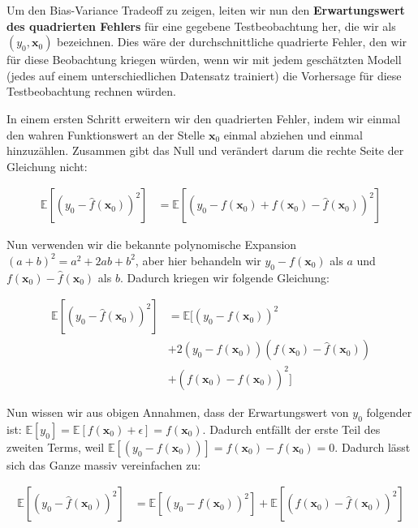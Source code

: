 \documentclass[
]{book}
\begin{document}
Um den Bias-Variance Tradeoff zu zeigen, leiten wir nun den \textbf{Erwartungswert des quadrierten Fehlers} für eine gegebene Testbeobachtung her, die wir als \((y_0,\mathbf{x}_0)\) bezeichnen. Dies wäre der durchschnittliche quadrierte Fehler, den wir für diese Beobachtung kriegen würden, wenn wir mit jedem geschätzten Modell (jedes auf einem unterschiedlichen Datensatz trainiert) die Vorhersage für diese Testbeobachtung rechnen würden.

In einem ersten Schritt erweitern wir den quadrierten Fehler, indem wir einmal den wahren Funktionswert an der Stelle \(\mathbf{x}_0\) einmal abziehen und einmal hinzuzählen. Zusammen gibt das Null und verändert darum die rechte Seite der Gleichung nicht:

\begin{align}
\mathbb{E}\left[\left(y_0 - \hat{f}(\mathbf{x}_0)\right)^2\right] &= \mathbb{E}\left[\left(y_0 - f(\mathbf{x}_0) + f(\mathbf{x}_0) - \hat{f}(\mathbf{x}_0)\right)^2\right]
\end{align}

Nun verwenden wir die bekannte polynomische Expansion \((a+b)^2=a^2+2ab+b^2\), aber hier behandeln wir \(y_0 - f(\mathbf{x}_0)\) als \(a\) und \(f(\mathbf{x}_0) - \hat{f}(\mathbf{x}_0)\) als \(b\). Dadurch kriegen wir folgende Gleichung:

\begin{align}
\mathbb{E}\left[\left(y_0 - \hat{f}(\mathbf{x}_0)\right)^2\right] &= \mathbb{E}\biggl[\left(y_0 - f(\mathbf{x}_0)\right)^2 \\
&+ 2\left(y_0 - f(\mathbf{x}_0)\right)(f(\mathbf{x}_0) - \hat{f}(\mathbf{x}_0)) \\
&+ (f(\mathbf{x}_0) - \hat{f}(\mathbf{x}_0))^2\biggr]
\end{align}

Nun wissen wir aus obigen Annahmen, dass der Erwartungswert von \(y_0\) folgender ist: \(\mathbb{E}[y_0]=\mathbb{E}[f(\mathbf{x}_0) + \epsilon]=f(\mathbf{x}_0)\). Dadurch entfällt der erste Teil des zweiten Terms, weil \(\mathbb{E}[\left(y_0 - f(\mathbf{x}_0)\right)]=f(\mathbf{x}_0) - f(\mathbf{x}_0)=0\). Dadurch lässt sich das Ganze massiv vereinfachen zu:

\begin{align}
\mathbb{E}\left[\left(y_0 - \hat{f}(\mathbf{x}_0)\right)^2\right] &= \mathbb{E}\left[\left(y_0 - f(\mathbf{x}_0)\right)^2\right] + \mathbb{E}\left[(f(\mathbf{x}_0) - \hat{f}(\mathbf{x}_0))^2\right]
\end{align}
\end{document}
